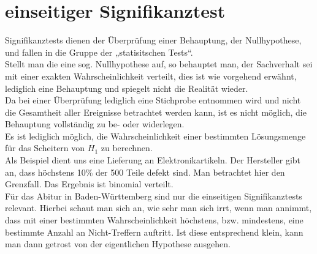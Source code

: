 \section{einseitiger Signifikanztest}
	Signifikanztests dienen der Überprüfung einer Behauptung, der Nullhypothese,
	und fallen in die Gruppe der „statisitschen Tests“.\\
	Stellt man die eine sog. Nullhypothese auf, so behauptet man, der Sachverhalt
	sei mit einer exakten Wahrscheinlichkeit verteilt, dies ist wie vorgehend
	erwähnt, lediglich eine Behauptung und spiegelt nicht die Realität wieder.\\
	Da bei einer Überprüfung lediglich eine Stichprobe entnommen wird und nicht die
	Gesamtheit aller Ereignisse betrachtet werden kann, ist es nicht möglich, die
	Behauptung vollständig zu be- oder widerlegen.\\
	Es ist lediglich möglich, die Wahrscheinlichkeit einer bestimmten Lösungsmenge
	für das Scheitern von \(H_1\) zu berechnen.\\
	Als Beispiel dient uns eine Lieferung an Elektronikartikeln. Der Hersteller
	gibt an, dass höchstens 10\% der 500 Teile defekt sind. Man betrachtet hier den
	Grenzfall. Das Ergebnis ist binomial verteilt.\\
	Für das Abitur in Baden-Württemberg sind nur die einseitigen Signifikanztests
	relevant.
	Hierbei schaut man sich an, wie sehr man sich irrt, wenn man annimmt, dass mit
	einer bestimmten Wahrscheinlichkeit höchstens, bzw. mindestens, eine bestimmte
	Anzahl an Nicht-Treffern auftritt. Ist diese entsprechend klein, kann man dann
	getrost von der eigentlichen Hypothese ausgehen.

	

	

	

	 
